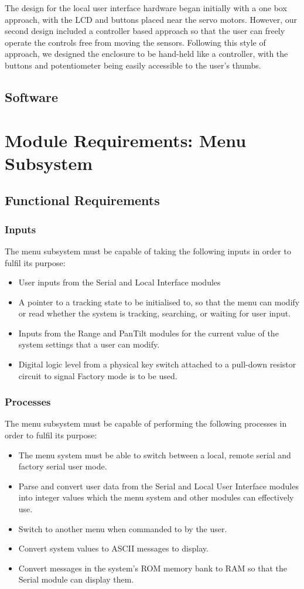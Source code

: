 \documentclass[]{report}
\begin{document}
The design for the local user interface hardware began initially with a one box approach, with the LCD and buttons placed near the servo motors. However, our second design included a controller based approach so that the user can freely operate the controls free from moving the sensors. Following this style of approach, we designed the enclosure to be hand-held like a controller, with the buttons and potentiometer being easily accessible to the user's thumbs. 
\subsection{Software}


\section{Module Requirements: Menu Subsystem}
\subsection{Functional Requirements}
\subsubsection{Inputs}
The menu subsystem must be capable of taking the following inputs in order to fulfil its purpose:
\begin{itemize}
	\item User inputs from the Serial and Local Interface modules
	\item A pointer to a tracking state to be initialised to, so that the menu can modify or read whether the system is tracking, searching, or waiting for user input.
	\item Inputs from the Range and PanTilt modules for the current value of the system settings that a user can modify. 
	\item Digital logic level from a physical key switch attached to a pull-down resistor circuit to signal Factory mode is to be used. 
\end{itemize}

\subsubsection{Processes}
The menu subsystem must be capable of performing the following processes in order to fulfil its purpose:
\begin{itemize}
	\item The menu system must be able to switch between a local, remote serial and factory serial user mode. 
	\item Parse and convert user data from the Serial and Local User Interface modules into integer values which the menu system and other modules can effectively use. 
	\item Switch to another menu when commanded to by the user.
	\item Convert system values to ASCII messages to display.
	\item Convert messages in the system's ROM memory bank to RAM so that the Serial module can display them. 
\end{itemize}
\end{document}
